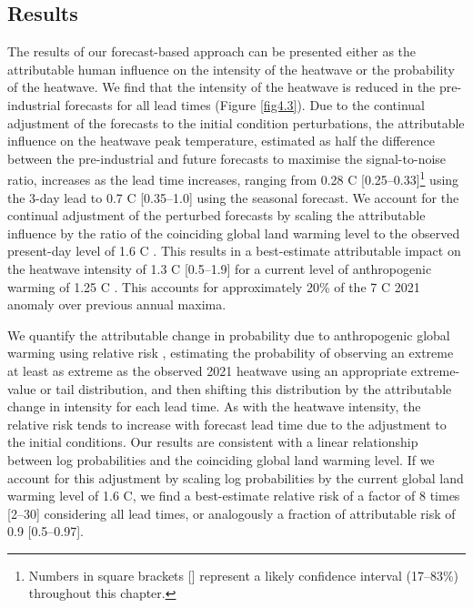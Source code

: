   \subsection{Results}

  The results of our forecast-based approach can be presented either as the attributable human influence on the intensity of the heatwave or the probability of the heatwave. We find that the intensity of the heatwave is reduced in the pre-industrial forecasts for all lead times (Figure \ref{fig4.3}). Due to the continual adjustment of the forecasts to the initial condition perturbations, the attributable influence on the heatwave peak temperature, estimated as half the difference between the pre-industrial and future forecasts to maximise the signal-to-noise ratio, increases as the lead time increases, ranging from 0.28 \textdegree{}C [0.25--0.33]\footnote{Numbers in square brackets [] represent a likely confidence interval (17--83\%) throughout this chapter.} using the 3-day lead to 0.7 \textdegree{}C [0.35--1.0] using the seasonal forecast. We account for the continual adjustment of the perturbed forecasts by scaling the attributable influence by the ratio of the coinciding global land warming level to the observed present-day level of 1.6 \textdegree{}C \cite{osborn_land_2021}. This results in a best-estimate attributable impact on the heatwave intensity of 1.3 \textdegree{}C [0.5--1.9] for a current level of anthropogenic warming of 1.25 \textdegree{}C \cite{haustein_real-time_2017}. This accounts for approximately 20\% of the 7 \textdegree{}C 2021 anomaly over previous annual maxima.

  We quantify the attributable change in probability due to anthropogenic global warming using relative risk \cite{stone_end--end_2005}, estimating the probability of observing an extreme at least as extreme as the observed 2021 heatwave using an appropriate extreme-value or tail distribution, and then shifting this distribution by the attributable change in intensity for each lead time. As with the heatwave intensity, the relative risk tends to increase with forecast lead time due to the adjustment to the initial conditions. Our results are consistent with a linear relationship between log probabilities and the coinciding global land warming level. If we account for this adjustment by scaling log probabilities by the current global land warming level of 1.6 \textdegree{}C, we find a best-estimate relative risk of a factor of 8 times [2--30] considering all lead times, or analogously a fraction of attributable risk of 0.9 [0.5--0.97]. 

